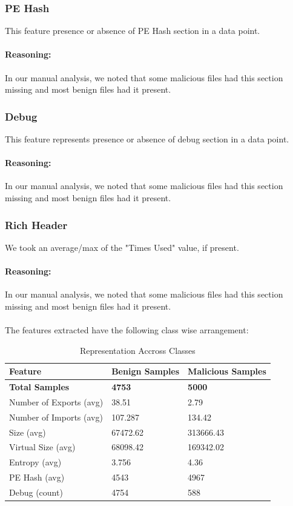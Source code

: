\documentclass{llncs}
\begin{document}
\subsubsection{PE Hash}
This feature presence or absence of PE Hash section in a data point.
\paragraph{Reasoning:}
In our manual analysis, we noted that some malicious files had this section missing and most benign files had it present.

\subsubsection{Debug}
This feature represents presence or absence of debug section in a data point.
\paragraph{Reasoning:}
In our manual analysis, we noted that some malicious files had this section missing and most benign files had it present.

\subsubsection{Rich Header}
We took an average/max of the "Times Used" value, if present. 
\paragraph{Reasoning:}
In our manual analysis, we noted that some malicious files had this section missing and most benign files had it present.

\paragraph{}
The features extracted have the following class wise arrangement:

\begin{table}[h]
	\centering
	\caption{Representation Accross Classes}
	\begin{tabular}{ |p{5cm}||p{3cm}||p{3cm}|}
		\hline
		Feature						&Benign Samples 			&Malicious Samples\\
		\hline
		\textbf{Total Samples}				&\textbf{4753}						&\textbf{5000}\\
		\hline
		Number of Exports (avg)     	  &38.51						  &2.79\\
		Number of Imports (avg)   	  &107.287                          &134.42\\
		Size (avg)           					&67472.62					    &313666.43\\
		Virtual Size (avg)      			&68098.42				    &169342.02\\
		Entropy (avg)        					&3.756 							&4.36\\
		PE Hash (avg)        			&4543							&4967\\
		Debug (count)						&4754							&588\\
		 \hline
\end{tabular}
\label{table}
\end{table}
\end{document}
